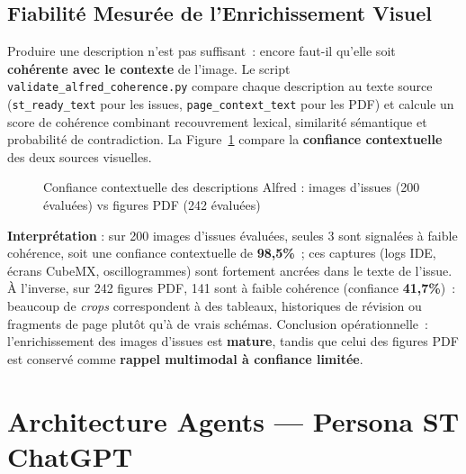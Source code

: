 \documentclass[12pt,a4paper]{report}
\begin{document}
\subsection{Fiabilité Mesurée de l'Enrichissement Visuel}
\label{sec:alfred_contextual_trust}

Produire une description n'est pas suffisant~: encore faut-il qu'elle soit \textbf{cohérente avec le contexte} de l'image. Le script \texttt{validate\_alfred\_coherence.py} compare chaque description au texte source (\texttt{st\_ready\_text} pour les issues, \texttt{page\_context\_text} pour les PDF) et calcule un score de cohérence combinant recouvrement lexical, similarité sémantique et probabilité de contradiction. La Figure~\ref{fig:alfred_trust} compare la \textbf{confiance contextuelle} des deux sources visuelles.

\begin{figure}[H]
\centering
{}
\caption{Confiance contextuelle des descriptions Alfred : images d'issues (200 évaluées) vs figures PDF (242 évaluées)}
\label{fig:alfred_trust}
\end{figure}

\textbf{Interprétation} : sur 200 images d'issues évaluées, seules 3 sont signalées à faible cohérence, soit une confiance contextuelle de \textbf{98,5\%}~; ces captures (logs IDE, écrans CubeMX, oscillogrammes) sont fortement ancrées dans le texte de l'issue. À l'inverse, sur 242 figures PDF, 141 sont à faible cohérence (confiance \textbf{41,7\%})~: beaucoup de \textit{crops} correspondent à des tableaux, historiques de révision ou fragments de page plutôt qu'à de vrais schémas. Conclusion opérationnelle~: l'enrichissement des images d'issues est \textbf{mature}, tandis que celui des figures PDF est conservé comme \textbf{rappel multimodal à confiance limitée}.

\section{Architecture Agents --- Persona ST ChatGPT}
\end{document}
